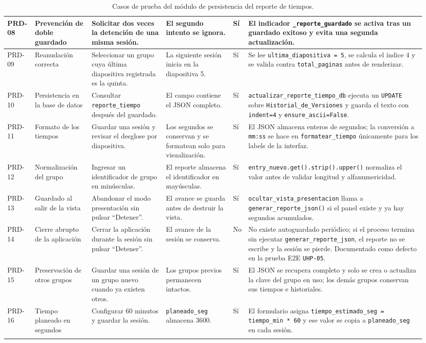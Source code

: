 \documentclass[12pt,letterpaper]{article}
\begin{document}
{\begin{longtable}{|L{1.1cm}|L{2.3cm}|L{3.2cm}|L{3.6cm}|L{1.2cm}|L{3.6cm}|}
PRD-08 & Prevención de doble guardado & Solicitar dos veces la detención de una misma sesión. & El segundo intento se ignora. & Sí & El indicador \texttt{\_reporte\_guardado} se activa tras un guardado exitoso y evita una segunda actualización. \\ \hline
PRD-09 & Reanudación correcta & Seleccionar un grupo cuya última diapositiva registrada es la quinta. & La siguiente sesión inicia en la diapositiva 5. & Sí & Se lee \texttt{ultima\_diapositiva = 5}, se calcula el índice 4 y se valida contra \texttt{total\_paginas} antes de renderizar. \\ \hline
PRD-10 & Persistencia en la base de datos & Consultar \texttt{reporte\_tiempo} después del guardado. & El campo contiene el JSON completo. & Sí & \texttt{actualizar\_reporte\_tiempo\_db} ejecuta un \texttt{UPDATE} sobre \texttt{Historial\_de\_Versiones} y guarda el texto con \texttt{indent=4} y \texttt{ensure\_ascii=False}. \\ \hline
PRD-11 & Formato de los tiempos & Guardar una sesión y revisar el desglose por diapositiva. & Los segundos se conservan y se formatean solo para visualización. & Sí & El JSON almacena enteros de segundos; la conversión a \texttt{mm:ss} se hace en \texttt{formatear\_tiempo} únicamente para los labels de la interfaz. \\ \hline
PRD-12 & Normalización del grupo & Ingresar un identificador de grupo en minúsculas. & El reporte almacena el identificador en mayúsculas. & Sí & \texttt{entry\_nuevo.get().strip().upper()} normaliza el valor antes de validar longitud y alfanumericidad. \\ \hline
PRD-13 & Guardado al salir de la vista & Abandonar el modo presentación sin pulsar ``Detener''. & El avance se guarda antes de destruir la vista. & Sí & \texttt{ocultar\_vista\_presentacion} llama a \texttt{generar\_reporte\_json()} si el panel existe y ya hay segundos acumulados. \\ \hline
PRD-14 & Cierre abrupto de la aplicación & Cerrar la aplicación durante la sesión sin pulsar ``Detener''. & El avance de la sesión se conserva. & No & No existe autoguardado periódico; si el proceso termina sin ejecutar \texttt{generar\_reporte\_json}, el reporte no se escribe y la sesión se pierde. Documentado como defecto en la prueba E2E \texttt{UHP-05}. \\ \hline
PRD-15 & Preservación de otros grupos & Guardar una sesión de un grupo nuevo cuando ya existen otros. & Los grupos previos permanecen intactos. & Sí & El JSON se recupera completo y solo se crea o actualiza la clave del grupo en uso; los demás grupos conservan sus tiempos e historiales. \\ \hline
PRD-16 & Tiempo planeado en segundos & Configurar 60 minutos y guardar la sesión. & \texttt{planeado\_seg} almacena 3600. & Sí & El formulario asigna \texttt{tiempo\_estimado\_seg = tiempo\_min * 60} y ese valor se copia a \texttt{planeado\_seg} en cada sesión. \\ \hline
\caption{Casos de prueba del módulo de persistencia del reporte de tiempos.}
\label{tab:casos-prueba-modulo-reporte}
\end{longtable}
}
\end{document}
